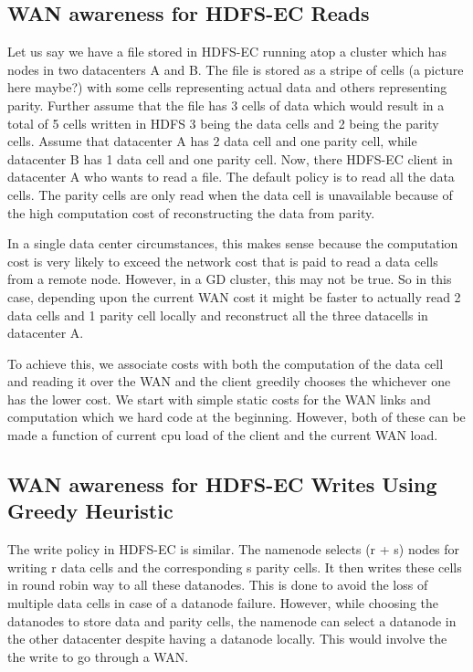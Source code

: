 \documentclass{sig-alternate-05-2015}
\begin{document}
\subsection{WAN awareness for HDFS-EC Reads}
Let us say we have a file stored in HDFS-EC running atop a cluster which has nodes in two datacenters A and B. The file is stored as a stripe of cells (a picture here maybe?) with some cells representing actual data and others representing parity. Further assume that the file has 3 cells of data which would result in a total of 5 cells written in HDFS 3 being the data cells and 2 being the parity cells. Assume that datacenter A has 2 data cell and one parity cell, while datacenter B has 1 data cell and one parity cell. Now, there HDFS-EC client in datacenter A who wants to read a file.  The default policy is to read all the data cells. The parity cells are only read when the data cell is unavailable because of the high computation cost of reconstructing the data from parity.


In a single data center circumstances, this makes sense because the computation cost is very likely to exceed the network cost that is paid to read a data cells from a remote node.  However, in a GD cluster, this may not be true. So in this case, depending upon the current WAN cost it might be faster to actually read 2 data cells and 1 parity cell locally and reconstruct all the three datacells in datacenter A.

To achieve this, we associate costs with both the computation of the data cell and reading it over the WAN and the client greedily chooses the whichever one has the lower cost. We start with simple static costs for the WAN links and computation which we hard code at the beginning. However, both of these can be made a function of current cpu load of the client and the current WAN load.

\subsection{WAN awareness for HDFS-EC Writes Using Greedy Heuristic}
The write policy in HDFS-EC is similar. The namenode selects (r + s) nodes for writing r data cells and the corresponding s parity cells. It then writes these cells in round robin way to all these datanodes. This is done to avoid the loss of multiple data cells in case of a datanode failure. However, while choosing the datanodes to store data and parity cells, the namenode can select a datanode in the other datacenter despite having a datanode locally. This would involve the the write to go through a WAN. 
\end{document}
